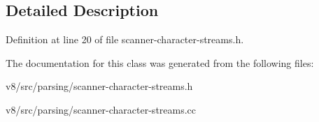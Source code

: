 \subsection{Detailed Description}


Definition at line 20 of file scanner-\/character-\/streams.\+h.



The documentation for this class was generated from the following files\+:\begin{DoxyCompactItemize}
\item 
v8/src/parsing/scanner-\/character-\/streams.\+h\item 
v8/src/parsing/scanner-\/character-\/streams.\+cc\end{DoxyCompactItemize}
